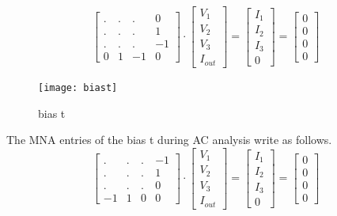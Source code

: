 \begin{equation}
\begin{bmatrix}
 . & . & .  &  0\\
 . & . & .  &  1\\
 . & . & .  & -1\\
 0 & 1 & -1 &  0
\end{bmatrix}
\cdot
\begin{bmatrix}
V_{1}\\
V_{2}\\
V_{3}\\
I_{out}
\end{bmatrix}
=
\begin{bmatrix}
I_{1}\\
I_{2}\\
I_{3}\\
0
\end{bmatrix}
=
\begin{bmatrix}
0\\
0\\
0\\
0
\end{bmatrix}
\end{equation}

\begin{figure}[ht]
\begin{center}
\texttt{[image: biast]}
\end{center}
\caption{bias t}
\label{fig:biast}
\end{figure}
\FloatBarrier

The MNA entries of the bias t during AC analysis write as
follows.
\begin{equation}
\begin{bmatrix}
 . & . & .  & -1\\
 . & . & .  &  1\\
 . & . & .  &  0\\
-1 & 1 & 0  &  0
\end{bmatrix}
\cdot
\begin{bmatrix}
V_{1}\\
V_{2}\\
V_{3}\\
I_{out}
\end{bmatrix}
=
\begin{bmatrix}
I_{1}\\
I_{2}\\
I_{3}\\
0
\end{bmatrix}
=
\begin{bmatrix}
0\\
0\\
0\\
0
\end{bmatrix}
\end{equation}

